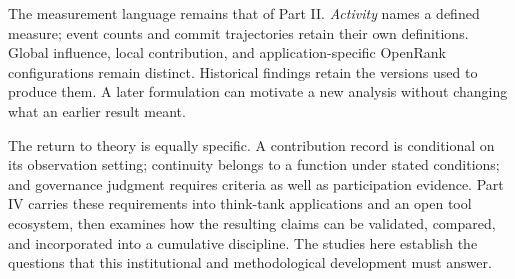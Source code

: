 The measurement language remains that of Part II. \emph{Activity} names a defined measure; event counts and commit trajectories retain their own definitions. Global influence, local contribution, and application-specific OpenRank configurations remain distinct. Historical findings retain the versions used to produce them. A later formulation can motivate a new analysis without changing what an earlier result meant.

The return to theory is equally specific. A contribution record is conditional on its observation setting; continuity belongs to a function under stated conditions; and governance judgment requires criteria as well as participation evidence. Part IV carries these requirements into think-tank applications and an open tool ecosystem, then examines how the resulting claims can be validated, compared, and incorporated into a cumulative discipline. The studies here establish the questions that this institutional and methodological development must answer.
\clearpage
